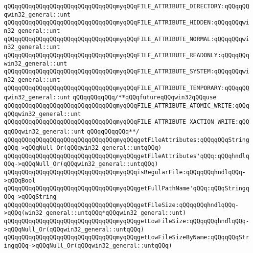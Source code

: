 \verb|qQQqqQQqqQQqqQQqqQQqqQQqqQQqqQQqmyqQQqFILE_ATTRIBUTE_DIRECTORY:qQQqqQQqwin32_general::unt|\newline
\verb|qQQqqQQqqQQqqQQqqQQqqQQqqQQqqQQqmyqQQqFILE_ATTRIBUTE_HIDDEN:qQQqqQQqwin32_general::unt|\newline
\verb|qQQqqQQqqQQqqQQqqQQqqQQqqQQqqQQqmyqQQqFILE_ATTRIBUTE_NORMAL:qQQqqQQqwin32_general::unt|\newline
\verb|qQQqqQQqqQQqqQQqqQQqqQQqqQQqqQQqmyqQQqFILE_ATTRIBUTE_READONLY:qQQqqQQqwin32_general::unt|\newline
\verb|qQQqqQQqqQQqqQQqqQQqqQQqqQQqqQQqmyqQQqFILE_ATTRIBUTE_SYSTEM:qQQqqQQqwin32_general::unt|\newline
\verb|qQQqqQQqqQQqqQQqqQQqqQQqqQQqqQQqmyqQQqFILE_ATTRIBUTE_TEMPORARY:qQQqqQQqwin32_general::unt|\newline
\verb|qQQqqQQqqQQq/**qQQqfutureqQQqwin32qQQquse|\newline
\verb|qQQqqQQqqQQqqQQqqQQqqQQqqQQqqQQqmyqQQqFILE_ATTRIBUTE_ATOMIC_WRITE:qQQqqQQqwin32_general::unt|\newline
\verb|qQQqqQQqqQQqqQQqqQQqqQQqqQQqqQQqmyqQQqFILE_ATTRIBUTE_XACTION_WRITE:qQQqqQQqwin32_general::unt|\newline
\verb|qQQqqQQqqQQq**/|\newline
\newline
\verb|qQQqqQQqqQQqqQQqqQQqqQQqqQQqqQQqmyqQQqgetFileAttributes:qQQqqQQqStringqQQq->qQQqNull_Or(qQQqwin32_general::untqQQq)|\newline
\verb|qQQqqQQqqQQqqQQqqQQqqQQqqQQqqQQqmyqQQqgetFileAttributes'qQQq:qQQqhndlqQQq->qQQqNull_Or(qQQqwin32_general::untqQQq)|\newline
\newline
\verb|qQQqqQQqqQQqqQQqqQQqqQQqqQQqqQQqmyqQQqisRegularFile:qQQqqQQqhndlqQQq->qQQqBool|\newline
\newline
\verb|qQQqqQQqqQQqqQQqqQQqqQQqqQQqqQQqmyqQQqgetFullPathName'qQQq:qQQqStringqQQq->qQQqString|\newline
\newline
\verb|qQQqqQQqqQQqqQQqqQQqqQQqqQQqqQQqmyqQQqgetFileSize:qQQqqQQqhndlqQQq->qQQq(win32_general::untqQQq*qQQqwin32_general::unt)|\newline
\verb|qQQqqQQqqQQqqQQqqQQqqQQqqQQqqQQqmyqQQqgetLowFileSize:qQQqqQQqhndlqQQq->qQQqNull_Or(qQQqwin32_general::untqQQq)|\newline
\verb|qQQqqQQqqQQqqQQqqQQqqQQqqQQqqQQqmyqQQqgetLowFileSizeByName:qQQqqQQqStringqQQq->qQQqNull_Or(qQQqwin32_general::untqQQq)|\newline
